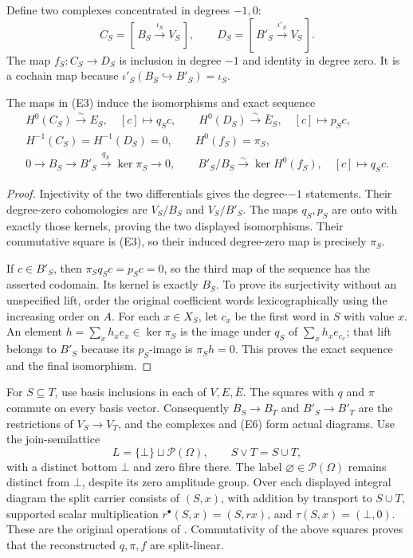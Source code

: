Define two complexes concentrated in degrees \(-1,0\):
\[
 C_S=[\,B_S\overset{\iota_S}{\longrightarrow}V_S\,],\qquad
 D_S=[\,B'_S\overset{\iota'_S}{\longrightarrow}V_S\,].
 \tag{E5}
\]
The map \(f_S:C_S\to D_S\) is inclusion in degree \(-1\) and identity
in degree zero.  It is a cochain map because
\(\iota'_S(B_S\hookrightarrow B'_S)=\iota_S\).

\begin{theorem}
The maps in (E3) induce the isomorphisms and exact sequence
\[
 \begin{gathered}
 H^0(C_S)\overset{\sim}{\longrightarrow}E_S,\quad[c]\longmapsto q_Sc,
 \qquad
 H^0(D_S)\overset{\sim}{\longrightarrow}\bar E_S,\quad[c]\longmapsto p_Sc,\\
 H^{-1}(C_S)=H^{-1}(D_S)=0,\qquad H^0(f_S)=\pi_S,\\
 0\longrightarrow B_S\longrightarrow B'_S
       \overset{q_S}{\longrightarrow}\ker\pi_S\longrightarrow0,\qquad
 B'_S/B_S\overset{\sim}{\longrightarrow}\ker H^0(f_S),
       \quad[c]\longmapsto q_Sc .
 \end{gathered}
 \tag{E6}
\]
\end{theorem}
\begin{proof}
Injectivity of the two differentials gives the degree-\(-1\) statements.
Their degree-zero cohomologies are \(V_S/B_S\) and \(V_S/B'_S\).
The maps \(q_S,p_S\) are onto with exactly those kernels, proving the two
displayed isomorphisms.  Their commutative square is (E3), so their induced
degree-zero map is precisely \(\pi_S\).

If \(c\in B'_S\), then \(\pi_Sq_Sc=p_Sc=0\), so the third map of the
sequence has the asserted codomain.  Its kernel is exactly \(B_S\).
To prove its surjectivity without an unspecified lift, order the original
coefficient words lexicographically using the increasing order on \(A\).
For each \(x\in X_S\), let \(c_x\) be the first word in \(S\) with value
\(x\).  An element \(h=\sum_xh_xe_x\in\ker\pi_S\) is the image under
\(q_S\) of \(\sum_xh_xe_{c_x}\); that lift belongs to \(B'_S\) because
its \(p_S\)-image is \(\pi_Sh=0\).  This proves the exact sequence and
the final isomorphism.
\end{proof}

For \(S\subseteq T\), use basis inclusions in each of \(V,E,\bar E\).
The squares with \(q\) and \(\pi\) commute on every basis vector.
Consequently \(B_S\to B_T\) and \(B'_S\to B'_T\) are the restrictions
of \(V_S\to V_T\), and the complexes and (E6) form actual diagrams.
Use the join-semilattice
\[
 L=\{\bot\}\sqcup\mathcal P(\Omega),\qquad S\vee T=S\cup T,
 \tag{E7}
\]
with a distinct bottom \(\bot\) and zero fibre there.  The label
\(\varnothing\in\mathcal P(\Omega)\) remains distinct from \(\bot\),
despite its zero amplitude group.  Over each displayed integral diagram
the split carrier consists of \((S,x)\), with addition by transport to
\(S\cup T\), supported scalar multiplication \(r^\bullet(S,x)=(S,rx)\),
and \(\tau(S,x)=(\bot,0)\).  These are the original operations
of \cite[(D2)]{ep:support}.  Commutativity of the above squares proves
that the reconstructed \(q,\pi,f\) are split-linear.

